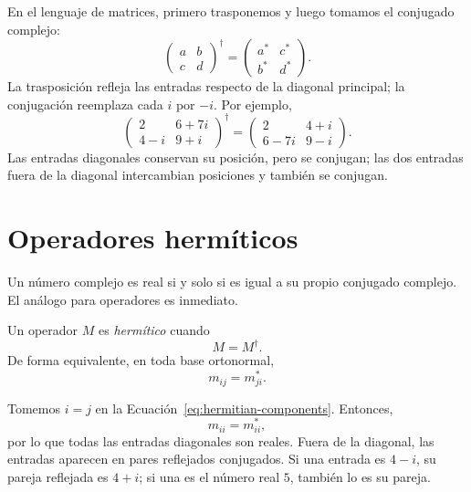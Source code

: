 En el lenguaje de matrices, primero trasponemos y luego tomamos el conjugado complejo:
\begin{equation}
\begin{pmatrix}
a&b\\
c&d
\end{pmatrix}^{\!\dagger}
=
\begin{pmatrix}
a^*&c^*\\
b^*&d^*
\end{pmatrix}.
\label{eq:dagger-two-by-two}
\end{equation}
La trasposición refleja las entradas respecto de la diagonal principal; la conjugación reemplaza cada \(i\) por \(-i\). Por ejemplo,
\begin{equation}
\begin{pmatrix}
2&6+7i\\
4-i&9+i
\end{pmatrix}^{\!\dagger}
=
\begin{pmatrix}
2&4+i\\
6-7i&9-i
\end{pmatrix}.
\label{eq:dagger-numerical-example}
\end{equation}
Las entradas diagonales conservan su posición, pero se conjugan; las dos entradas fuera de la diagonal intercambian posiciones y también se conjugan.

\section{Operadores hermíticos}

Un número complejo es real si y solo si es igual a su propio conjugado complejo. El análogo para operadores es inmediato.

\begin{definition}
Un operador \(M\) es \emph{hermítico} cuando
\begin{equation}
M=M^\dagger.
\label{eq:hermitian-definition}
\end{equation}
De forma equivalente, en toda base ortonormal,
\begin{equation}
m_{ij}=m_{ji}^*.
\label{eq:hermitian-components}
\end{equation}
\end{definition}

Tomemos \(i=j\) en la Ecuación~\eqref{eq:hermitian-components}. Entonces,
\[
m_{ii}=m_{ii}^*,
\]
por lo que todas las entradas diagonales son reales. Fuera de la diagonal, las entradas aparecen en pares reflejados conjugados. Si una entrada es \(4-i\), su pareja reflejada es \(4+i\); si una es el número real \(5\), también lo es su pareja.

